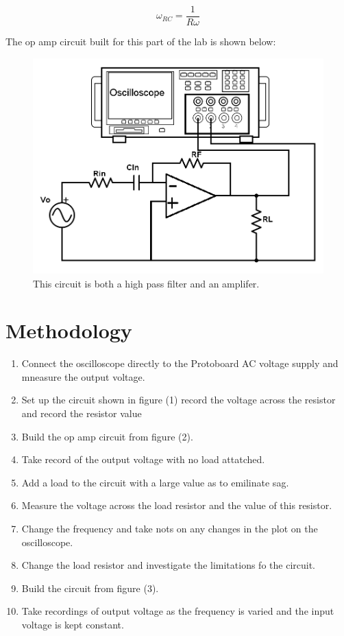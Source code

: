 \documentclass[twocolumn, amsmath]{revtex4}
\begin{document}
\begin{equation}
\omega_{RC} =  \frac{1}{R\omega}
\end{equation}

 The op amp circuit built for this part of the lab is shown below:

\begin{figure}[h]
    \includegraphics[scale=0.3]{highpassamp.png}  
    \caption{This circuit is both a high pass filter and an amplifer.}
\end{figure}


\section{Methodology}

\begin{enumerate}
    \item Connect the oscilloscope directly to the Protoboard AC voltage supply and mneasure the output voltage.
    \item Set up the circuit shown in figure (1) record the voltage across the resistor and record the resistor value
    \item Build the op amp circuit from figure (2).
    \item Take record of the output voltage with no load attatched.
    \item Add a load to the circuit with a large value as to emilinate sag.
    \item Measure the voltage across the load resistor and the value of this resistor.
    \item Change the frequency and take nots on any changes in the plot on the oscilloscope.
    \item Change the load resistor and investigate the limitations fo the circuit.
    \item Build the circuit from figure (3).
    \item Take recordings of output voltage as the frequency is varied and the input voltage is kept constant.
\end{enumerate}
\end{document}

